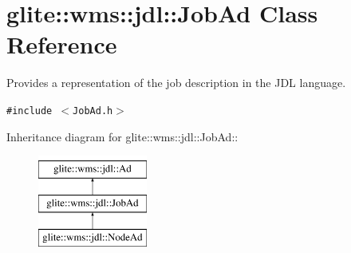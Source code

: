 \hypertarget{classglite_1_1wms_1_1jdl_1_1JobAd}{
\section{glite::wms::jdl::Job\-Ad Class Reference}
\label{classglite_1_1wms_1_1jdl_1_1JobAd}
}
Provides a representation of the job description in the JDL language.  


{\tt \#include $<$Job\-Ad.h$>$}

Inheritance diagram for glite::wms::jdl::Job\-Ad::\begin{figure}[H]
\begin{center}
\leavevmode
\includegraphics[height=3cm]{classglite_1_1wms_1_1jdl_1_1JobAd}
\end{center}
\end{figure}
